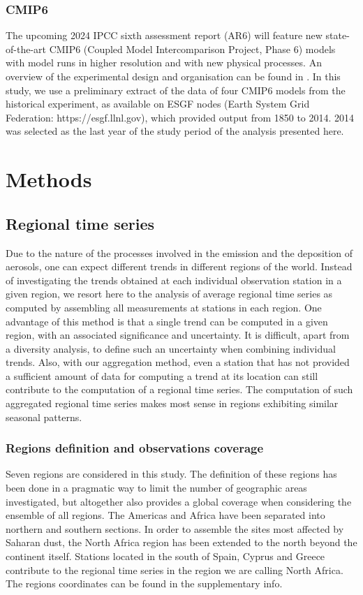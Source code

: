 \documentclass[acp, manuscript]{copernicus}
\begin{document}
\subsubsection{CMIP6}
The upcoming 2024 IPCC sixth assessment report (AR6) will feature new state-of-the-art CMIP6 (Coupled Model Intercomparison Project, Phase 6) models with model runs in higher resolution and with new physical processes. An overview of the experimental design and organisation can be found in \cite{eyring2016overview}.  In this study, we use a preliminary extract of the data of four CMIP6 models from the historical experiment, as available on ESGF nodes (Earth System Grid Federation: https://esgf.llnl.gov), which provided output from 1850 to 2014. 2014 was selected as the last year of the study period of the analysis presented here.



\section{Methods}

\subsection{Regional time series}
Due to the nature of the processes involved in the emission and the deposition of aerosols, one can expect different trends in different regions of the world. Instead of investigating the trends obtained at each individual observation station in a given region, we resort here to the analysis of average regional time series as computed by assembling all measurements at stations in each region. One advantage of this method is that a single trend can be computed in a given region, with an associated significance and uncertainty. It is difficult, apart from a diversity analysis, to define such an uncertainty when combining individual trends. Also, with our aggregation method, even a station that has not provided a sufficient amount of data for computing a trend at its location can still contribute to the computation of a regional time series. The computation of such aggregated regional time series makes most sense in regions exhibiting similar seasonal patterns.

\subsubsection{Regions definition and observations coverage}
Seven regions are considered in this study. The definition of these regions has been done in a pragmatic way to limit the number of geographic areas investigated, but altogether also provides a global coverage when considering the ensemble of all regions. The Americas and Africa have been separated into northern and southern sections. In order to assemble the sites most affected by Saharan dust, the North Africa region has been extended to the north beyond the continent itself. Stations located in the south of Spain, Cyprus and Greece contribute to the regional time series in the region we are calling North Africa. The regions coordinates can be found in the supplementary info.
\end{document}
